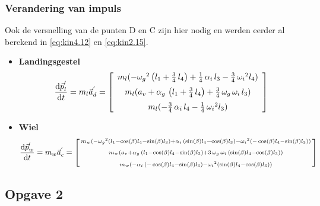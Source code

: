\subsubsection{Verandering van impuls}
Ook de versnelling van de punten D en C zijn hier nodig en werden eerder al berekend in \eqref{eq:kin4.12} en \eqref{eq:kin2.15}.
\begin{itemize}
\item \textbf{Landingsgestel}
\begin{equation}
\frac{\mathrm{d}\vec{p}_{l}^{'}}{\mathrm{d}t}=m_{l}\vec{a}_{d}^{'}
=\left[ \begin {array}{c} m_{l}(-{\omega_{g}}^{2} \left( l_{1}+\frac{3}{4}\,l_{4} \right) +\frac{1}{4} \,\alpha_{i}\,l_{3}-\frac{3}{4}\,{\omega_{i}}^{2}l_{4})\\ \noalign{\medskip}m_{l}(a_{v}+\alpha_{g}\, \left( l_{1}+\frac{3}{4}\,l_{4} \right) +\frac{3}{4}\,\omega_{g}\,\omega_{i}\,l_{3})\\ \noalign{\medskip}m_{l}(-\frac{3}{4}\,\alpha_{i}\,l_{4}-\frac{1}{4}\,{\omega_{i}}^{2}l_{3})\end {array} \right]
\label{eq:dyn1.3}
\end{equation}
\item \textbf{Wiel}
\def\arraystretch{0.5}
\begin{equation}
\frac{\mathrm{d}\vec{p}_{w}^{'}}{\mathrm{d}t}=m_{w}\vec{a}_{c}^{'}
=\left[\begin{smallmatrix}m_{w}(-{\omega_{g}}^{2}\left(l_{1}-\cos\left(\beta\right)l_{4}-\sin\left(\beta\right)l_{3}\right)+\alpha_{i}\, \left(\sin\left(\beta\right)l_{4}-\cos\left(\beta\right)l_{3}\right)-{\omega_{i}}^{2}\left(-\cos\left(\beta\right)l_{4}-\sin \left(\beta\right)l_{3}\right))\\ \noalign{\medskip}m_{w}(a_{v}+\alpha_{g}\, \left( l_{1}-\cos \left( \beta \right) l_{4}-\sin \left(\beta\right)l_{3}\right)+3\,\omega_{g}\,\omega_{i}\,\left(\sin\left(\beta\right)l_{4}-\cos\left(\beta\right)l_{3}\right))\\ \noalign{\medskip}m_{w}(-\alpha_{i}\,\left(-\cos\left(\beta\right)l_{4}-\sin\left(\beta\right)l_{3}\right)-{\omega_{i}}^{2}\left(\sin \left(\beta\right)l_{4}-\cos\left(\beta\right)l_{3}\right))\end{smallmatrix}\right]
\label{eq:dyn1.4}
\end{equation}
\end{itemize}
\newpage
\subsection{Opgave 2}
